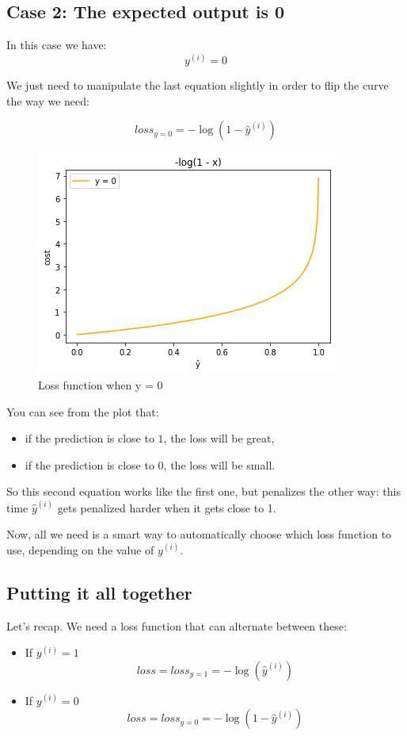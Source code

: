 \newpage

\subsection*{Case 2: The expected output is 0}

In this case we have:
$$
y^{(i)} = 0
$$  

We just need to manipulate the last equation slightly in order to flip the curve the way we need:

$$
loss_{y=0} = -\log(1 - \hat{y}^{(i)})
$$

\begin{figure}[!h]
    \centering
    \includegraphics[scale=0.55]{assets/-log_1-x.png}
    \caption{Loss function when y = 0}
\end{figure}

You can see from the plot that: 
\begin{itemize}
    \item if the prediction is close to $1$, the loss will be great, 
    \item if the prediction is close to $0$, the loss will be small.  
\end{itemize}

So this second equation works like the first one, but penalizes the other way: this time $\hat{y}^{(i)}$ gets penalized harder when it gets close to 1.

Now, all we need is a smart way to automatically choose which loss function to use, depending on the value of $y^{(i)}$.

\subsection*{Putting it all together}
Let's recap. We need a loss function that can alternate between these:
\begin{itemize}
    \item If $y^{(i)} = 1$
          $$
          loss = loss_{y=1} = -\log(\hat{y}^{(i)})
          $$
    
    \item If $y^{(i)} = 0$
          $$
          loss = loss_{y=0} = -\log(1- \hat{y}^{(i)})
          $$
\end{itemize}



